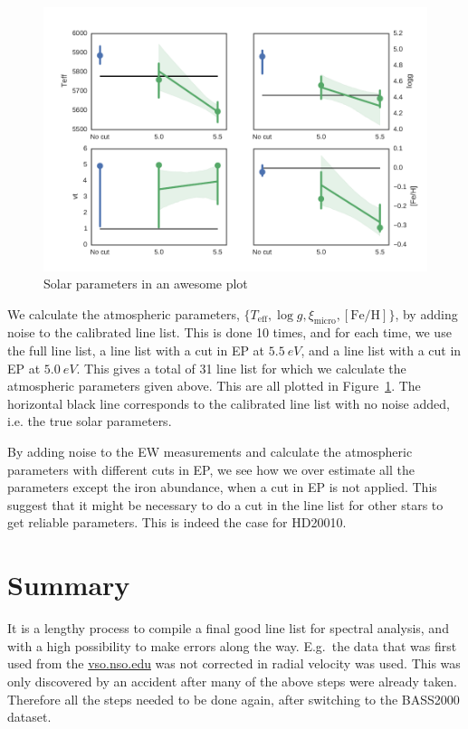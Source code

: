 \documentclass{aa}
\begin{document}
\begin{figure}[htpb]
    \centering
    \includegraphics[width=0.9\linewidth]{figures/solar_parameters_10runs.pdf}
    \caption{Solar parameters in an awesome plot}
    \label{fig:solar_parameters}
\end{figure}

We calculate the atmospheric parameters, $\{T_\mathrm{eff}, \log
g, \xi_\mathrm{micro}, [\mathrm{Fe/H}]\}$, by adding noise to the
calibrated line list. This is done 10 times, and for each time, we use
the full line list, a line list with a cut in EP at $\SI{5.5}{eV}$, and
a line list with a cut in EP at $\SI{5.0}{eV}$. This gives a total of
31 line list for which we calculate the atmospheric parameters given
above. This are all plotted in Figure~\ref{fig:solar_parameters}. The
horizontal black line corresponds to the calibrated line list with no
noise added, i.e. the true solar parameters.


By adding noise to the EW measurements and calculate the atmospheric
parameters with different cuts in EP, we see how we over estimate all
the parameters except the iron abundance, when a cut in EP is not
applied. This suggest that it might be necessary to do a cut in the line
list for other stars to get reliable parameters. This is indeed the case
for HD20010.











\section{Summary}
\label{sec:conclusion}
It is a lengthy process to compile a final good line list for spectral
analysis, and with a high possibility to make errors along the way. E.g.\ the
data that was first used from the \url{vso.nso.edu} was not corrected in radial
velocity was used. This was only discovered by an accident after many of the
above steps were already taken. Therefore all the steps needed to be done
again, after switching to the BASS2000 dataset.
\end{document}
